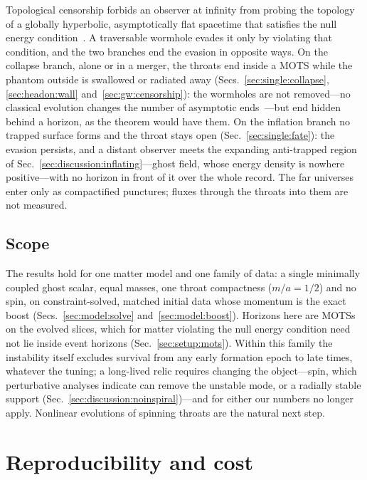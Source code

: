 \documentclass[twocolumn,floatfix,aps,prd,superscriptaddress,nofootinbib]{revtex4-2}
\begin{document}
Topological censorship forbids an observer at infinity from probing the topology of a globally hyperbolic, asymptotically flat spacetime that satisfies the null energy condition~\cite{friedman1993}. A traversable wormhole evades it only by violating that condition, and the two branches end the evasion in opposite ways. On the collapse branch, alone or in a merger, the throats end inside a MOTS while the phantom outside is swallowed or radiated away (Secs.~\ref{sec:single:collapse}, \ref{sec:headon:wall} and~\ref{sec:gw:censorship}): the wormholes are not removed---no classical evolution changes the number of asymptotic ends~\cite{geroch1967}---but end hidden behind a horizon, as the theorem would have them. On the inflation branch no trapped surface forms and the throat stays open (Sec.~\ref{sec:single:fate}): the evasion persists, and a distant observer meets the expanding anti-trapped region of Sec.~\ref{sec:discussion:inflating}---ghost field, whose energy density is nowhere positive---with no horizon in front of it over the whole record. The far universes enter only as compactified punctures; fluxes through the throats into them are not measured.

\subsection{Scope}
\label{sec:discussion:open}

The results hold for one matter model and one family of data: a single minimally coupled ghost scalar, equal masses, one throat compactness ($m/a=1/2$) and no spin, on constraint-solved, matched initial data whose momentum is the exact boost (Secs.~\ref{sec:model:solve} and~\ref{sec:model:boost}). Horizons here are MOTSs on the evolved slices, which for matter violating the null energy condition need not lie inside event horizons (Sec.~\ref{sec:setup:mots}). Within this family the instability itself excludes survival from any early formation epoch to late times, whatever the tuning; a long-lived relic requires changing the object---spin, which perturbative analyses indicate can remove the unstable mode, or a radially stable support (Sec.~\ref{sec:discussion:noinspiral})---and for either our numbers no longer apply. Nonlinear evolutions of spinning throats are the natural next step.

\section{Reproducibility and cost}
\label{sec:repro}
\label{sec:cost}
\end{document}
